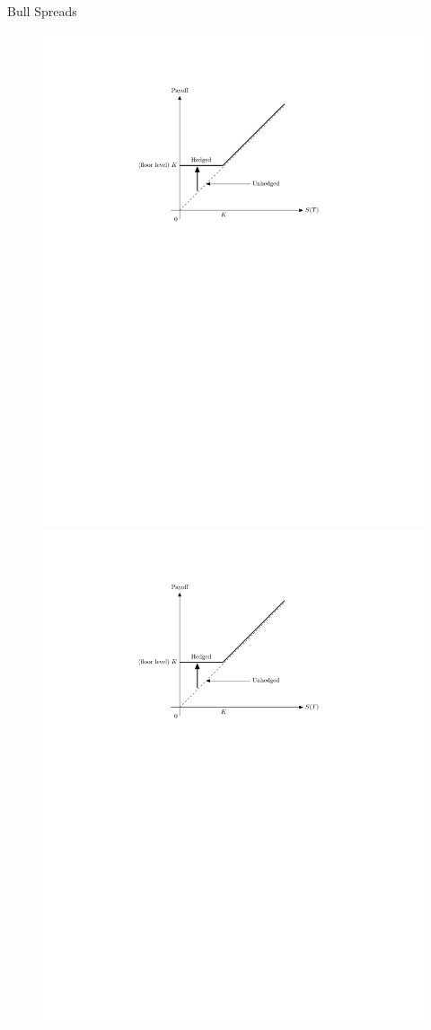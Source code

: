 \documentclass[10pt,handout]{beamer}
\theoremstyle{definition}
\begin{document}
\begin{frame}{Bull Spreads}
  \begin{figure}[!htbp]
    \centering
    \includegraphics[scale=0.7,page=5]{fig/note08/lo.pdf}
    \includegraphics[scale=0.7,page=6]{fig/note08/lo.pdf}

\end{figure}
\end{frame}
\end{document}
